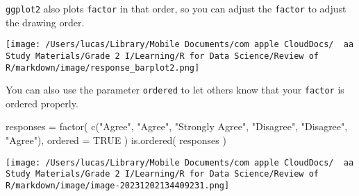 \documentclass[
]{article}
\let\oldincludegraphics\includegraphics
\renewcommand{\includegraphics}[2][]{\begin{center}\oldincludegraphics[#1]{#2}\end{center}}
\newenvironment{Shaded}{}{}
\newcommand{\AttributeTok}[1]{\textcolor[rgb]{0.49,0.56,0.16}{#1}}
\newcommand{\CommentTok}[1]{\textcolor[rgb]{0.38,0.63,0.69}{\textit{#1}}}
\newcommand{\ConstantTok}[1]{\textcolor[rgb]{0.53,0.00,0.00}{#1}}
\newcommand{\FunctionTok}[1]{\textcolor[rgb]{0.02,0.16,0.49}{#1}}
\newcommand{\NormalTok}[1]{#1}
\newcommand{\OtherTok}[1]{\textcolor[rgb]{0.00,0.44,0.13}{#1}}
\newcommand{\SpecialCharTok}[1]{\textcolor[rgb]{0.25,0.44,0.63}{#1}}
\newcommand{\StringTok}[1]{\textcolor[rgb]{0.25,0.44,0.63}{#1}}
\begin{document}
\texttt{ggplot2} also plots \texttt{factor} in that order, so you can
adjust the \texttt{factor} to adjust the drawing order.

\begin{Shaded}
\end{Shaded}

\texttt{[image: /Users/lucas/Library/Mobile Documents/com~apple~CloudDocs/~~aa Study Materials/Grade 2 I/Learning/R for Data Science/Review of R/markdown/image/response\_barplot2.png]}

You can also use the parameter \texttt{ordered} to let others know that
your \texttt{factor} is ordered properly.

\begin{Shaded}
\begin{Highlighting}[]
\NormalTok{responses }\OtherTok{=}
  \FunctionTok{factor}\NormalTok{(}
    \FunctionTok{c}\NormalTok{(}\StringTok{"Agree"}\NormalTok{, }\StringTok{"Agree"}\NormalTok{, }\StringTok{"Strongly Agree"}\NormalTok{, }\StringTok{"Disagree"}\NormalTok{, }\StringTok{"Disagree"}\NormalTok{, }\StringTok{"Agree"}\NormalTok{),}
    \AttributeTok{ordered =} \ConstantTok{TRUE}
\NormalTok{  )}
\FunctionTok{is.ordered}\NormalTok{( responses )}
\end{Highlighting}
\end{Shaded}

\texttt{[image: /Users/lucas/Library/Mobile Documents/com~apple~CloudDocs/~~aa Study Materials/Grade 2 I/Learning/R for Data Science/Review of R/markdown/image/image-20231202134409231.png]}
\end{document}
